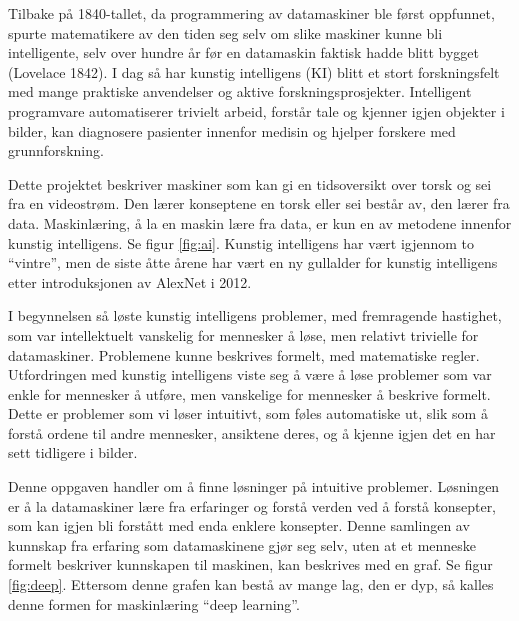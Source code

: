 Tilbake på 1840-tallet, da programmering av datamaskiner ble først oppfunnet, spurte matematikere av den tiden seg selv om slike maskiner kunne bli intelligente, selv over hundre år før en datamaskin faktisk hadde blitt bygget (Lovelace 1842). I dag så har kunstig intelligens (KI) blitt et stort forskningsfelt med mange praktiske anvendelser og aktive forskningsprosjekter. Intelligent programvare automatiserer trivielt arbeid, forstår tale og kjenner igjen objekter i bilder, kan diagnosere pasienter innenfor medisin og hjelper forskere med grunnforskning. \cite{Goodfellow m.fl. 2016 s. 1}

Dette projektet beskriver maskiner som kan gi en tidsoversikt over torsk og sei fra en videostrøm. Den lærer konseptene en torsk eller sei består av, den lærer fra data. Maskinlæring, å la en maskin lære fra data, er kun en av metodene innenfor kunstig intelligens. Se figur \ref{fig:ai}. Kunstig intelligens har vært igjennom to ``vintre'', men de siste åtte årene har vært en ny gullalder for kunstig intelligens etter introduksjonen av AlexNet i 2012. \cite{Canziani m.fl. 2017 s. 1}

I begynnelsen så løste kunstig intelligens problemer, med fremragende hastighet, som var intellektuelt vanskelig for mennesker å løse, men relativt trivielle for datamaskiner. Problemene kunne beskrives formelt, med matematiske regler. Utfordringen med kunstig intelligens viste seg å være å løse problemer som var enkle for mennesker å utføre, men vanskelige for mennesker å beskrive formelt. Dette er problemer som vi løser intuitivt, som føles automatiske ut, slik som å forstå ordene til andre mennesker, ansiktene deres, og å kjenne igjen det en har sett tidligere i bilder. \cite{Goodfellow m.fl. 2016 s. 1}

Denne oppgaven handler om å finne løsninger på intuitive problemer. Løsningen er å la datamaskiner lære fra erfaringer og forstå verden ved å forstå konsepter, som kan igjen bli forstått med enda enklere konsepter. Denne samlingen av kunnskap fra erfaring som datamaskinene gjør seg selv, uten at et menneske formelt beskriver kunnskapen til maskinen, kan beskrives med en graf. Se figur \ref{fig:deep}. Ettersom denne grafen kan bestå av mange lag, den er dyp, så kalles denne formen for maskinlæring ``deep learning''. \cite{Goodfellow m.fl. 2016 s. 1}


